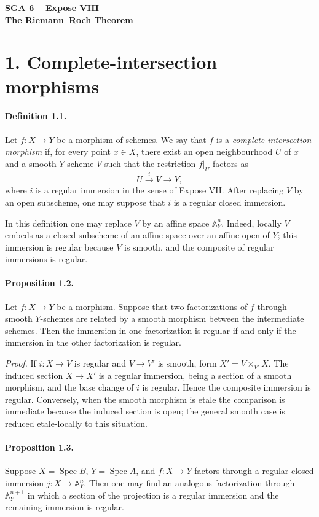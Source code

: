 \documentclass[12pt]{article}
\newcommand{\Spec}{\operatorname{Spec}}
\newcommand{\xto}[1]{\xrightarrow{#1}}
\newcommand{\bbA}{\mathbb A}
\begin{document}
\begin{center}
{\Large\textbf{SGA 6 -- Expose VIII}}\\[0.35em]
{\large\textbf{The Riemann--Roch Theorem}}
\end{center}

\section*{1. Complete-intersection morphisms}

\paragraph{Definition 1.1.} Let $f:X\to Y$ be a morphism of schemes. We say that $f$ is a \emph{complete-intersection morphism} if, for every point $x\in X$, there exist an open neighbourhood $U$ of $x$ and a smooth $Y$-scheme $V$ such that the restriction $f|_U$ factors as
\[
U\xto{i}V\to Y,
\]
where $i$ is a regular immersion in the sense of Expose VII. After replacing $V$ by an open subscheme, one may suppose that $i$ is a regular closed immersion.

In this definition one may replace $V$ by an affine space $\bbA^n_Y$. Indeed, locally $V$ embeds as a closed subscheme of an affine space over an affine open of $Y$; this immersion is regular because $V$ is smooth, and the composite of regular immersions is regular.

\paragraph{Proposition 1.2.} Let $f:X\to Y$ be a morphism. Suppose that two factorizations of $f$ through smooth $Y$-schemes are related by a smooth morphism between the intermediate schemes. Then the immersion in one factorization is regular if and only if the immersion in the other factorization is regular.

\emph{Proof.} If $i:X\to V$ is regular and $V\to V'$ is smooth, form $X'=V\times_{V'}X$. The induced section $X\to X'$ is a regular immersion, being a section of a smooth morphism, and the base change of $i$ is regular. Hence the composite immersion is regular. Conversely, when the smooth morphism is etale the comparison is immediate because the induced section is open; the general smooth case is reduced etale-locally to this situation.

\paragraph{Proposition 1.3.} Suppose $X=\Spec B$, $Y=\Spec A$, and $f:X\to Y$ factors through a regular closed immersion $j:X\to\bbA^n_Y$. Then one may find an analogous factorization through $\bbA^{n+1}_Y$ in which a section of the projection is a regular immersion and the remaining immersion is regular.
\end{document}
